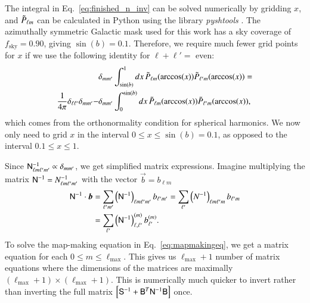 \documentclass[twocolumn]{../common/aa}
\newcommand{\B}[0]{\tens{B}}
\newcommand{\N}[0]{\tens{N}}
\renewcommand{\S}[0]{\tens{S}}
\begin{document}
The integral in Eq.~\eqref{eq:finished_n_inv} can be solved numerically by gridding $x$, and $\Tilde{P}_{\ell m}$ can be calculated in Python using the library \textit{pyshtools} \citep{https://doi.org/10.1029/2018GC007529}. The azimuthally symmetric Galactic mask used for this work has a sky coverage of $f_{\mathrm{sky}} = 0.90$, giving $\sin(b) = 0.1$. Therefore, we require much fewer grid points for $x$ if we use the following identity for $\ell+\ell' = $ even:
\begin{align}
&\delta_{mm'} \int_{\sin(b)}^{1} dx \, \Tilde{P}_{\ell m}(\arccos(x)) \Tilde{P}_{\ell' m}(\arccos(x)) = \\
\frac{1}{4\pi}\delta_{\ell \ell'}\delta_{m m'} - &\delta_{mm'} \int_{0}^{\sin(b)} dx \, \Tilde{P}_{\ell m}(\arccos(x)) \Tilde{P}_{\ell' m}(\arccos(x)),
\end{align}
which comes from the orthonormality condition for spherical harmonics. We now only need to grid $x$ in the interval $0\leq x \leq \sin(b) = 0.1$, as opposed to the interval $0.1 \leq x \leq 1$.

Since $\N^{-1}_{\ell m \ell' m'} \propto \delta_{m m'}$, we get simplified matrix expressions. Imagine multiplying the matrix $\N^{-1} = N^{-1}_{\ell m \ell' m'}$ with the vector $\vec{b} = b_{\ell m}$
\begin{align}
\N^{-1} \cdot \vec{b} &= \sum_{\ell' m'}\left(\N^{-1}\right)_{\ell m \ell' m'}b_{\ell' m'} = \sum_{\ell'}\left(N^{-1}\right)_{\ell m \ell' m}b_{\ell' m}\\
&= \sum_{\ell' }\left(\N^{-1}\right)^{(m)}_{\ell, \ell'}b^{(m)}_{\ell'}.
\end{align}
To solve the map-making equation in Eq.~\eqref{eq:mapmakingeq}, we get a matrix equation for each $0 \leq m \leq \ell_{\mathrm{max}}$. This gives us $\ell_{\textrm{max}}+1$ number of matrix equations where the dimensions of the matrices are maximally $(\ell_{\textrm{max}}+1) \times (\ell_{\textrm{max}}+1)$. This is numerically much quicker to invert rather than inverting the full matrix $\left[\S^{-1} + \B^T \N^{-1}\B \right]$ once.
\end{document}
